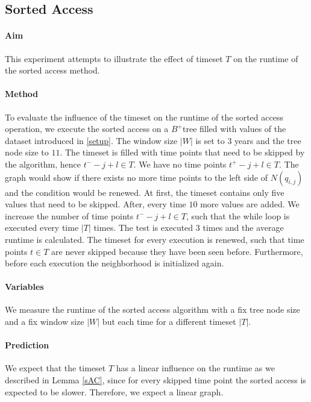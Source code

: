 \documentclass[abstracton,12pt,oneside]{scrreprt}
\begin{document}
\subsection{Sorted Access}

\paragraph{Aim}

This experiment attempts to illustrate the effect of timeset $T$ on the runtime of the sorted access method. 

\paragraph{Method}
To evaluate the influence of the timeset on the runtime of the sorted access operation, we execute the sorted access on a $B^+$tree filled with values of the dataset introduced in \ref{setup}. The window size $|W|$ is set to 3 years and the tree node size to $11$. The timeset is filled with time points that need to be skipped by the algorithm, hence $t^- -j +l\in T$. We have no time points $t^+ -j + l \in T$. The graph would show if there exists no more time points to the left side of $N(q_{i,j})$ and the condition would be renewed. At first, the timeset contains only five values that need to be skipped. After, every time $10$ more values are added. We increase the number of time points $t^- -j + l \in T$, such that the while loop is executed every time $|T|$ times. The test is executed 3 times and the average runtime is calculated. The timeset for every execution is renewed, such that time points $t \in T$ are never skipped because they have been seen before. Furthermore, before each execution the neighborhood is initialized again. 

\paragraph{Variables}
We measure the runtime of the sorted access algorithm with a fix tree node size and a fix window size $|W|$ but each time for a different timeset $|T|$. 

\paragraph{Prediction}
We expect that the timeset $T$ has a linear influence on the runtime as we described in Lemma \ref{sAC}, since for every skipped time point the sorted access is expected to be slower. Therefore, we expect a linear graph. 
\end{document}
